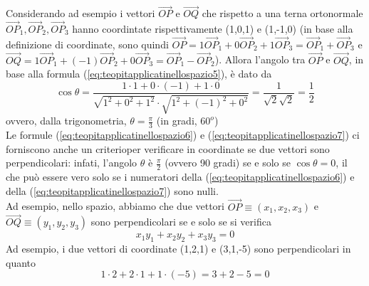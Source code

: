 \begin{es}
  Considerando ad esempio i vettori $\vec{OP}$ e $\vec{OQ}$ che rispetto a una terna ortonormale $\vec{OP}_1,\vec{OP}_2,\vec{OP}_3$ hanno coordintate rispettivamente (1,0,1) e (1,-1,0) (in base alla definizione di coordinate, sono quindi $\vec{OP}=1\vec{OP}_1+0\vec{OP}_2+1\vec{OP}_3=\vec{OP}_1+\vec{OP}_3$ e $\vec{OQ}=1\vec{OP}_1+(-1)\vec{OP}_2+0\vec{OP}_3=\vec{OP}_1-\vec{OP}_2$). Allora l'angolo tra $\vec{OP}$ e $\vec{OQ}$, in base alla formula (\ref{eq:teopitapplicatinellospazio5}), è dato da
  \begin{equation*}
   \cos \theta=\frac{1\cdot1+0\cdot(-1)+1\cdot 0}{\sqrt{1^2+0^2+1^2}\cdot\sqrt{1^2+(-1)^2+0^2}}=\frac{1}{\sqrt{2}\sqrt{2}}=\frac{1}{2}
  \end{equation*}
  ovvero, dalla trigonometria, $\theta=\frac{\pi}{3}$ (in gradi, $60^o$)\\
  Le formule (\ref{eq:teopitapplicatinellospazio6}) e (\ref{eq:teopitapplicatinellospazio7}) ci forniscono anche un criterioper verificare in coordinate se due vettori sono perpendicolari: infati, l'angolo $\theta$ è $\frac{\pi}{2}$ (ovvero 90 gradi) se e solo se $\cos\theta =0$, il che può essere vero solo se i numeratori della  (\ref{eq:teopitapplicatinellospazio6}) e della (\ref{eq:teopitapplicatinellospazio7}) sono nulli.\\
  Ad esempio, nello spazio, abbiamo che due vettori $\vec{OP}\equiv(x_1,x_2,x_3)$ e $\vec{OQ}\equiv(y_1,y_2,y_3)$ sono perpendicolari se e solo se si verifica
  \begin{equation}
    \label{eq:teopitapplicatinellospazio8}
    x_1y_1+x_2y_2+x_3y_3=0
  \end{equation}
  Ad esempio, i due vettori di coordinate (1,2,1) e (3,1,-5) sono perpendicolari in quanto
  \begin{equation*}
    1\cdot 2+2\cdot 1+1\cdot (-5)=3+2-5=0
  \end{equation*}
\end{es}
